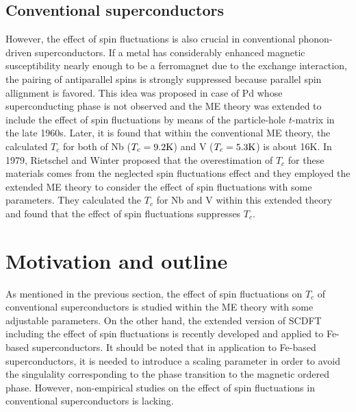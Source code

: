 \subsection{Conventional superconductors}
However, the effect of spin fluctuations is also crucial in conventional phonon-driven superconductors.
If a metal has considerably enhanced magnetic susceptibility nearly enough to be a ferromagnet
due to the exchange interaction, the pairing of antiparallel spins is strongly suppressed because
parallel spin allignment is favored. This idea was proposed in case of Pd whose superconducting phase
is not observed\cite{Parks1969} and the ME theory was extended to include the effect of spin 
fluctuations by means of the particle-hole $t$-matrix in the late 1960s\cite{Berk1966, Schrieffer1968}.
Later, it is found that within the conventional ME theory, the calculated $T_c$ for both of Nb 
($T_c = 9.2 \rm K$) and V ($T_c = 5.3 \rm K$) is about 16K\cite{Papa1977}.
In 1979, Rietschel and Winter\cite{Rietschel1979} proposed that the overestimation of $T_c$ for 
these materials comes from the neglected spin fluctuations effect and they employed the extended ME 
theory to consider the effect of spin fluctuations with some parameters. They calculated the $T_c$ 
for Nb and V within this extended theory and found that the effect of spin fluctuations suppresses $T_c$. 

\section{Motivation and outline}
As mentioned in the previous section, the effect of spin fluctuations on $T_c$ of conventional 
superconductors is studied within the ME theory with some adjustable parameters.
On the other hand, the extended version of SCDFT including the effect of spin fluctuations is 
recently developed\cite{Essenberger2014} and applied to Fe-based superconductors\cite{Essenberger2016}.
It should be noted that in application to Fe-based superconductors, it is needed to introduce a
scaling parameter in order to avoid the singulality corresponding to the phase transition to the 
magnetic ordered phase.
However, non-empirical studies on the effect of spin fluctuations in conventional superconductors
is lacking.

